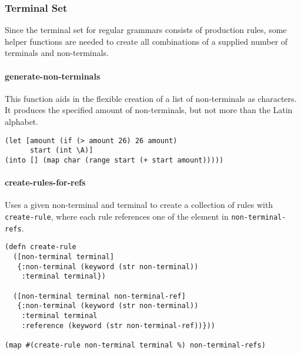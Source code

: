 \documentclass[runningheads]{llncs}
\begin{document}
\subsubsection{Terminal Set}
Since the terminal set for regular grammars consists of production rules, some helper functions are needed to create all combinations of a supplied number of terminals and non-terminals.

\paragraph{generate-non-terminals}
This function aids in the flexible creation of a list of non-terminals as characters. It produces the specified amount of non-terminals, but not more than the Latin alphabet.
\begin{lstlisting}
(let [amount (if (> amount 26) 26 amount)
      start (int \A)]
(into [] (map char (range start (+ start amount)))))
\end{lstlisting}

\paragraph{create-rules-for-refs}
Uses a given non-terminal and terminal to create a collection of rules with \texttt{create-rule}, where each rule references one of the element in \texttt{non-terminal-refs}.
\begin{lstlisting}
(defn create-rule
  ([non-terminal terminal]
   {:non-terminal (keyword (str non-terminal))
    :terminal terminal})

  ([non-terminal terminal non-terminal-ref]
   {:non-terminal (keyword (str non-terminal))
    :terminal terminal
    :reference (keyword (str non-terminal-ref))}))

(map #(create-rule non-terminal terminal %) non-terminal-refs)
\end{lstlisting}
\end{document}
